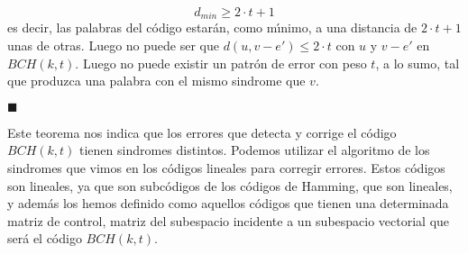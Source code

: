 \begin{displaymath}
d_{min}\geq 2\cdot t +1
\end{displaymath}
es decir, las palabras del c\'odigo estar\'an, como m\'{\i}nimo, a una distancia
de $2\cdot t+1$ unas de otras. Luego no puede ser que $d(u,v-e')\leq 2\cdot t$
con $u$ y $v-e'$ en $BCH(k,t)$. Luego no puede existir un patr\'on de error
con peso $t$, a lo sumo, tal que produzca una palabra con el mismo sindrome que
$v$.
\begin{flushright}
$\blacksquare$
\end{flushright}
Este teorema nos indica que los errores que detecta y corrige el c\'odigo
$BCH(k,t)$ tienen sindromes distintos. Podemos utilizar el algoritmo de los
sindromes que vimos en los c\'odigos lineales para corregir errores. Estos
c\'odigos son lineales, ya que son subc\'odigos de los c\'odigos de Hamming,
que son lineales, y adem\'as los hemos definido como aquellos c\'odigos que
tienen una determinada matriz de control, matriz del subespacio incidente a
un subespacio vectorial que ser\'a el c\'odigo $BCH(k,t)$.
